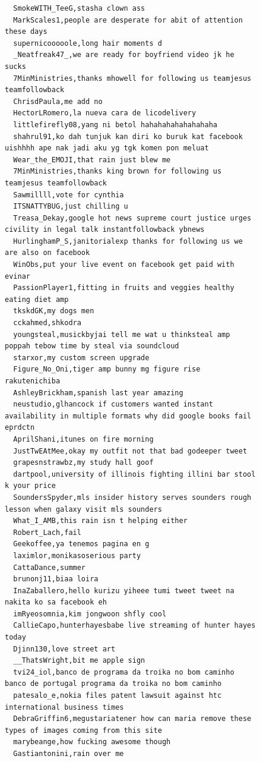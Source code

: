 \begin{figure}[htpb]
\begin{verbatim}
  SmokeWITH_TeeG,stasha clown ass
  MarkScales1,people are desperate for abit of attention these days
  supernicooooole,long hair moments d
  _Neatfreak47_,we are ready for boyfriend video jk he sucks
  7MinMinistries,thanks mhowell for following us teamjesus teamfollowback
  ChrisdPaula,me add no
  HectorLRomero,la nueva cara de licodelivery
  littlefirefly08,yang ni betol hahahahahahahahaha
  shahrul91,ko dah tunjuk kan diri ko buruk kat facebook uishhhh ape nak jadi aku yg tgk komen pon meluat
  Wear_the_EMOJI,that rain just blew me
  7MinMinistries,thanks king brown for following us teamjesus teamfollowback
  Sawmillll,vote for cynthia
  ITSNATTYBUG,just chilling u
  Treasa_Dekay,google hot news supreme court justice urges civility in legal talk instantfollowback ybnews
  HurlinghamP_S,janitorialexp thanks for following us we are also on facebook
  WinObs,put your live event on facebook get paid with evinar
  PassionPlayer1,fitting in fruits and veggies healthy eating diet amp
  tkskdGK,my dogs men
  cckahmed,shkodra
  youngsteal,musickbyjai tell me wat u thinksteal amp poppah tebow time by steal via soundcloud
  starxor,my custom screen upgrade
  Figure_No_Oni,tiger amp bunny mg figure rise rakutenichiba
  AshleyBrickham,spanish last year amazing
  neustudio,glhancock if customers wanted instant availability in multiple formats why did google books fail eprdctn
  AprilShani,itunes on fire morning
  JustTwEAtMee,okay my outfit not that bad godeeper tweet
  grapesnstrawbz,my study hall goof
  dartpool,university of illinois fighting illini bar stool k your price
  SoundersSpyder,mls insider history serves sounders rough lesson when galaxy visit mls sounders
  What_I_AMB,this rain isn t helping either
  Robert_Lach,fail
  Geekoffee,ya tenemos pagina en g
  laximlor,monikasoserious party
  CattaDance,summer
  brunonj11,biaa loira
  InaZaballero,hello kurizu yiheee tumi tweet tweet na nakita ko sa facebook eh
  imRyeosomnia,kim jongwoon shfly cool
  CallieCapo,hunterhayesbabe live streaming of hunter hayes today
  Djinn130,love street art
  __ThatsWright,bit me apple sign
  tvi24_iol,banco de programa da troika no bom caminho banco de portugal programa da troika no bom caminho
  patesalo_e,nokia files patent lawsuit against htc international business times
  DebraGriffin6,megustariatener how can maria remove these types of images coming from this site
  marybeange,how fucking awesome though
  Gastiantonini,rain over me


\end{verbatim}
\end{figure}
